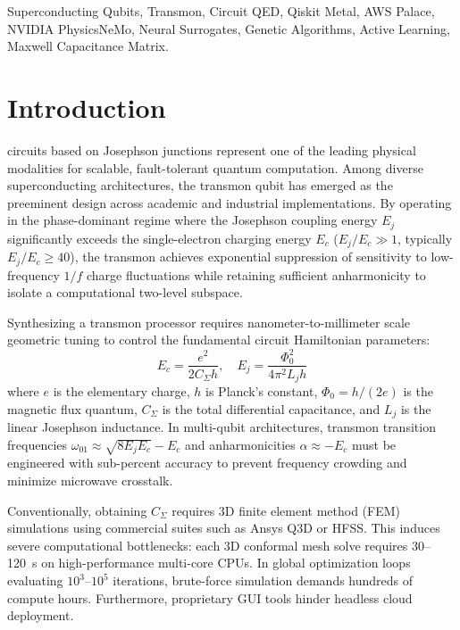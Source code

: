 \documentclass[journal,10pt,twocolumn]{IEEEtran}
\begin{document}
\begin{IEEEkeywords}
Superconducting Qubits, Transmon, Circuit QED, Qiskit Metal, AWS Palace, NVIDIA PhysicsNeMo, Neural Surrogates, Genetic Algorithms, Active Learning, Maxwell Capacitance Matrix.
\end{IEEEkeywords}

\section{Introduction}
 circuits based on Josephson junctions represent one of the leading physical modalities for scalable, fault-tolerant quantum computation. Among diverse superconducting architectures, the transmon qubit has emerged as the preeminent design across academic and industrial implementations. By operating in the phase-dominant regime where the Josephson coupling energy $E_j$ significantly exceeds the single-electron charging energy $E_c$ ($E_j / E_c \gg 1$, typically $E_j / E_c \ge 40$), the transmon achieves exponential suppression of sensitivity to low-frequency $1/f$ charge fluctuations while retaining sufficient anharmonicity to isolate a computational two-level subspace.

Synthesizing a transmon processor requires nanometer-to-millimeter scale geometric tuning to control the fundamental circuit Hamiltonian parameters:
\begin{equation}
E_c = \frac{e^2}{2 C_\Sigma h}, \quad E_j = \frac{\Phi_0^2}{4\pi^2 L_j h}
\label{eq:hamiltonian}
\end{equation}
where $e$ is the elementary charge, $h$ is Planck's constant, $\Phi_0 = h/(2e)$ is the magnetic flux quantum, $C_\Sigma$ is the total differential capacitance, and $L_j$ is the linear Josephson inductance. In multi-qubit architectures, transmon transition frequencies $\omega_{01} \approx \sqrt{8 E_j E_c} - E_c$ and anharmonicities $\alpha \approx -E_c$ must be engineered with sub-percent accuracy to prevent frequency crowding and minimize microwave crosstalk.

Conventionally, obtaining $C_\Sigma$ requires 3D finite element method (FEM) simulations using commercial suites such as Ansys Q3D or HFSS. This induces severe computational bottlenecks: each 3D conformal mesh solve requires 30--120~s on high-performance multi-core CPUs. In global optimization loops evaluating $10^3\text{--}10^5$ iterations, brute-force simulation demands hundreds of compute hours. Furthermore, proprietary GUI tools hinder headless cloud deployment.
\end{document}
